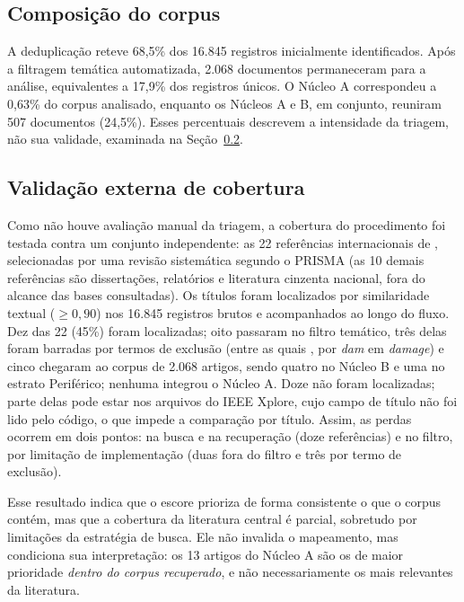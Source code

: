 \subsection{Composição do corpus}

A deduplicação reteve 68,5\% dos 16.845 registros inicialmente identificados. Após a filtragem temática automatizada, 2.068 documentos permaneceram para a análise, equivalentes a 17,9\% dos registros únicos. O Núcleo A correspondeu a 0,63\% do corpus analisado, enquanto os Núcleos A e B, em conjunto, reuniram 507 documentos (24,5\%). Esses percentuais descrevem a intensidade da triagem, não sua validade, examinada na Seção~\ref{sec:art-validacao}.

\subsection{Validação externa de cobertura}
\label{sec:art-validacao}

Como não houve avaliação manual da triagem, a cobertura do procedimento foi testada contra um conjunto independente: as 22 referências internacionais de , selecionadas por uma revisão sistemática segundo o PRISMA (as 10 demais referências são dissertações, relatórios e literatura cinzenta nacional, fora do alcance das bases consultadas). Os títulos foram localizados por similaridade textual ($\geq 0{,}90$) nos 16.845 registros brutos e acompanhados ao longo do fluxo. Dez das 22 (45\%) foram localizadas; oito passaram no filtro temático, três delas foram barradas por termos de exclusão (entre as quais , por \textit{dam} em \textit{damage}) e cinco chegaram ao corpus de 2.068 artigos, sendo quatro no Núcleo B e uma no estrato Periférico; nenhuma integrou o Núcleo A. Doze não foram localizadas; parte delas pode estar nos arquivos do IEEE Xplore, cujo campo de título não foi lido pelo código, o que impede a comparação por título. Assim, as perdas ocorrem em dois pontos: na busca e na recuperação (doze referências) e no filtro, por limitação de implementação (duas fora do filtro e três por termo de exclusão).

Esse resultado indica que o escore prioriza de forma consistente o que o corpus contém, mas que a cobertura da literatura central é parcial, sobretudo por limitações da estratégia de busca. Ele não invalida o mapeamento, mas condiciona sua interpretação: os 13 artigos do Núcleo A são os de maior prioridade \textit{dentro do corpus recuperado}, e não necessariamente os mais relevantes da literatura.


